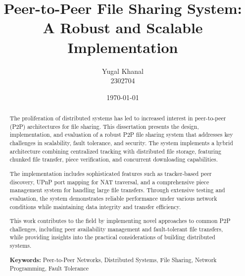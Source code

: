 

\lstset{style=mystyle}

\title{Peer-to-Peer File Sharing System:\\A Robust and Scalable Implementation}
\author{Yugal Khanal\\2302704}
\date{\today}



\maketitle

\begin{abstract}
	The proliferation of distributed systems has led to increased interest in peer-to-peer (P2P) architectures for file sharing. This dissertation presents the design, implementation, and evaluation of a robust P2P file sharing system that addresses key challenges in scalability, fault tolerance, and security. The system implements a hybrid architecture combining centralized tracking with distributed file storage, featuring chunked file transfer, piece verification, and concurrent downloading capabilities.

	The implementation includes sophisticated features such as tracker-based peer discovery, UPnP port mapping for NAT traversal, and a comprehensive piece management system for handling large file transfers. Through extensive testing and evaluation, the system demonstrates reliable performance under various network conditions while maintaining data integrity and transfer efficiency.

	This work contributes to the field by implementing novel approaches to common P2P challenges, including peer availability management and fault-tolerant file transfers, while providing insights into the practical considerations of building distributed systems.

	\textbf{Keywords:} Peer-to-Peer Networks, Distributed Systems, File Sharing, Network Programming, Fault Tolerance
\end{abstract}

